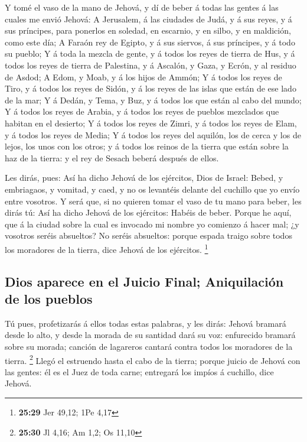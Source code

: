  Y tomé el vaso de la mano de Jehová, y dí de beber á
todas las gentes á las cuales me envió Jehová:  A
Jerusalem, á las ciudades de Judá, y á sus reyes, y á sus príncipes,
para ponerlos en soledad, en escarnio, y en silbo, y en maldición, como
este día;  A Faraón rey de Egipto, y á sus siervos, á sus
príncipes, y á todo su pueblo;  Y á toda la mezcla de
gente, y á todos los reyes de tierra de Hus, y á todos los reyes de
tierra de Palestina, y á Ascalón, y Gaza, y Ecrón, y al residuo de
Asdod;  A Edom, y Moab, y á los hijos de Ammón;
 Y á todos los reyes de Tiro, y á todos los reyes de
Sidón, y á los reyes de las islas que están de ese lado de la mar;
 Y á Dedán, y Tema, y Buz, y á todos los que están al
cabo del mundo;  Y á todos los reyes de Arabia, y á todos
los reyes de pueblos mezclados que habitan en el desierto;
 Y á todos los reyes de Zimri, y á todos los reyes de
Elam, y á todos los reyes de Media;  Y á todos los reyes
del aquilón, los de cerca y los de lejos, los unos con los otros; y á
todos los reinos de la tierra que están sobre la haz de la tierra: y el
rey de Sesach beberá después de ellos.

 Les dirás, pues: Así ha dicho Jehová de los ejércitos,
Dios de Israel: Bebed, y embriagaos, y vomitad, y caed, y no os
levantéis delante del cuchillo que yo envío entre vosotros.
 Y será que, si no quieren tomar el vaso de tu mano para
beber, les dirás tú: Así ha dicho Jehová de los ejércitos: Habéis de
beber.  Porque he aquí, que á la ciudad sobre la cual es
invocado mi nombre yo comienzo á hacer mal; ¿y vosotros seréis
absueltos? No seréis absueltos: porque espada traigo sobre todos los
moradores de la tierra, dice Jehová de los ejércitos. \footnote{\textbf{25:29}
  Jer 49,12; 1Pe 4,17}

\hypertarget{dios-aparece-en-el-juicio-final-aniquilaciuxf3n-de-los-pueblos}{%
\subsection{Dios aparece en el Juicio Final; Aniquilación de los
pueblos}\label{dios-aparece-en-el-juicio-final-aniquilaciuxf3n-de-los-pueblos}}

 Tú pues, profetizarás á ellos todas estas palabras, y
les dirás: Jehová bramará desde lo alto, y desde la morada de su
santidad dará su voz: enfurecido bramará sobre su morada; canción de
lagareros cantará contra todos los moradores de la tierra. \footnote{\textbf{25:30}
  Jl 4,16; Am 1,2; Os 11,10}  Llegó el estruendo hasta el
cabo de la tierra; porque juicio de Jehová con las gentes: él es el Juez
de toda carne; entregará los impíos á cuchillo, dice Jehová.

